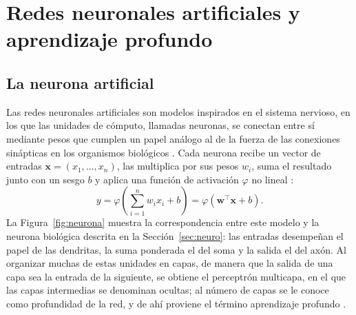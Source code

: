 \section[REDES NEURONALES ARTIFICIALES Y APRENDIZAJE PROFUNDO]{Redes neuronales artificiales y
aprendizaje profundo}

\subsection{La neurona artificial}

Las redes neuronales artificiales son modelos inspirados en el sistema nervioso, en los que las
unidades de cómputo, llamadas neuronas, se conectan entre sí mediante pesos que cumplen un papel
análogo al de la fuerza de las conexiones sinápticas en los organismos biológicos
\cite{aggarwal2018}. Cada neurona recibe un vector de entradas $\mathbf{x} = (x_1, \dots, x_n)$,
las multiplica por sus pesos $w_i$, suma el resultado junto con un sesgo $b$ y aplica una función
de activación $\varphi$ no lineal \cite{delbrio2002}:
\begin{equation}
y = \varphi\!\left(\sum_{i=1}^{n} w_i x_i + b\right) = \varphi\!\left(\mathbf{w}^{\top}\mathbf{x} + b\right).
\label{eq:neurona}
\end{equation}
La Figura~\ref{fig:neurona} muestra la correspondencia entre este modelo y la neurona biológica
descrita en la Sección~\ref{sec:neuro}: las entradas desempeñan el papel de las dendritas, la suma ponderada
el del soma y la salida el del axón. Al organizar muchas de estas unidades en capas, de manera que
la salida de una capa sea la entrada de la siguiente, se obtiene el perceptrón multicapa, en el que
las capas intermedias se denominan ocultas; al número de capas se le conoce como profundidad de la
red, y de ahí proviene el término aprendizaje profundo \cite{goodfellow2016}.

